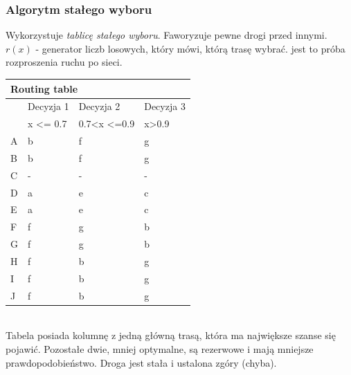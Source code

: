 \documentclass[a4paper,twoside]{article}
\begin{document}
			\subsubsection{Algorytm stałego wyboru}
				Wykorzystuje \textit{tablicę stałego wyboru}. Faworyzuje pewne drogi przed innymi. \\
				$ r(x) $ - generator liczb losowych, który mówi, którą trasę wybrać. jest to próba rozproszenia ruchu po sieci.\\
				\begin{tabular}{llll}
					\multicolumn{4}{l}{Routing table}                                                                                                  \\ \hline
					\multicolumn{1}{l|}{}  & \multicolumn{1}{l|}{Decyzja 1}         & \multicolumn{1}{l|}{Decyzja 2}                            &  \multicolumn{1}{l|}{Decyzja 3}              \\ \hline
					\multicolumn{1}{l|}{}  & \multicolumn{1}{l|}{x \textless= 0.7} & \multicolumn{1}{l|}{0.7\textless x \textless=0.9} & x\textgreater0.9 \\ \hline
					\multicolumn{1}{l|}{A} & \multicolumn{1}{l|}{b}                & \multicolumn{1}{l|}{f}                           & g               \\
					\multicolumn{1}{l|}{B} & \multicolumn{1}{l|}{b}                & \multicolumn{1}{l|}{f}                           & g               \\
					\multicolumn{1}{l|}{C} & \multicolumn{1}{l|}{-}                & \multicolumn{1}{l|}{-}                           & -              \\
					\multicolumn{1}{l|}{D} & \multicolumn{1}{l|}{a}                & \multicolumn{1}{l|}{e}                           & c              \\
					\multicolumn{1}{l|}{E} & \multicolumn{1}{l|}{a}                & \multicolumn{1}{l|}{e}                           & c              \\
					\multicolumn{1}{l|}{F} & \multicolumn{1}{l|}{f}                & \multicolumn{1}{l|}{g}                           & b               \\
					\multicolumn{1}{l|}{G} & \multicolumn{1}{l|}{f}                & \multicolumn{1}{l|}{g}                           & b               \\
					\multicolumn{1}{l|}{H} & \multicolumn{1}{l|}{f}                & \multicolumn{1}{l|}{b}                           & g               \\
					\multicolumn{1}{l|}{I} & \multicolumn{1}{l|}{f}                & \multicolumn{1}{l|}{b}                           & g               \\
					\multicolumn{1}{l|}{J} & \multicolumn{1}{l|}{f}                & \multicolumn{1}{l|}{b}                           & g              
				\end{tabular}\\
				Tabela posiada kolumnę z jedną główną trasą, która ma największe szanse się pojawić. Pozostałe dwie, mniej optymalne, są rezerwowe i mają mniejsze prawdopodobieństwo. Droga jest stała i ustalona  zgóry (chyba).
\end{document}
